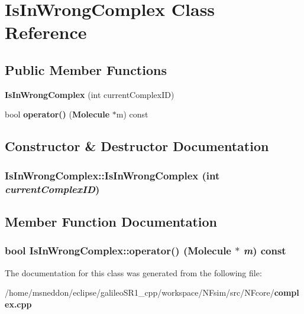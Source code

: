 \section{IsInWrongComplex Class Reference}
\label{classIsInWrongComplex}
\subsection*{Public Member Functions}
\begin{CompactItemize}
\item 
{\bf IsInWrongComplex} (int currentComplexID)
\item 
bool {\bf operator()} ({\bf Molecule} $\ast$m) const 
\end{CompactItemize}


\subsection{Constructor \& Destructor Documentation}
\subsubsection{\setlength{\rightskip}{0pt plus 5cm}IsInWrongComplex::IsInWrongComplex (int {\em currentComplexID})\hspace{0.3cm}{\tt  [inline]}}\label{classIsInWrongComplex_8ffb7d3c8b148441f1ec3b4bd23362af}




\subsection{Member Function Documentation}
\subsubsection{\setlength{\rightskip}{0pt plus 5cm}bool IsInWrongComplex::operator() ({\bf Molecule} $\ast$ {\em m}) const\hspace{0.3cm}{\tt  [inline]}}\label{classIsInWrongComplex_38f0096d82bcfc84bb3b1290fcd6241a}




The documentation for this class was generated from the following file:\begin{CompactItemize}
\item 
/home/msneddon/eclipse/galileoSR1\_\-cpp/workspace/NFsim/src/NFcore/{\bf complex.cpp}\end{CompactItemize}
